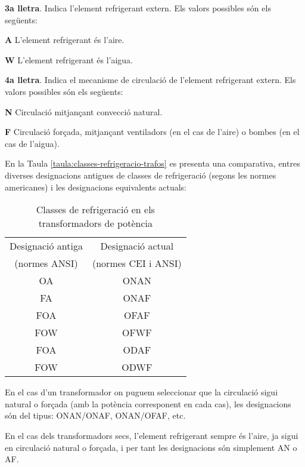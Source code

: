 \textbf{3a lletra}. Indica l'element refrigerant extern. Els valors
possibles s\'{o}n els seg\"{u}ents:
\begin{list}{}
   {\setlength{\labelwidth}{4.5mm} \setlength{\leftmargin}{4.5mm} \setlength{\labelsep}{2mm}}
   \item[\textbf{A}] L'element refrigerant \'{e}s l'aire.
   \item[\textbf{W}] L'element refrigerant \'{e}s l'aigua.
\end{list}
 

\textbf{4a lletra}. Indica el mecanisme de circulaci\'{o} de l'element
refrigerant extern. Els valors possibles s\'{o}n els seg\"{u}ents:
\begin{list}{}
   {\setlength{\labelwidth}{4.5mm} \setlength{\leftmargin}{4.5mm} \setlength{\labelsep}{2mm}}
   \item[\textbf{N}] Circulaci\'{o} mitjan\c{c}ant convecci\'{o} natural.
   \item[\textbf{F}] Circulaci\'{o} for\c{c}ada, mitjan\c{c}ant ventiladors (en el cas de
   l'aire) o bombes (en el cas de l'aigua).
\end{list}
 

En la Taula \vref{taula:classes-refrigeracio-trafos} es presenta una
comparativa, entres diverses designacions antigues de classes de
refrigeraci\'{o} (segons les normes americanes) i les designacions
equivalents actuals:
\begin{table}[htb]
   \caption{\label{taula:classes-refrigeracio-trafos}
   Classes de refrigeraci\'{o} en els transformadors de pot\`{e}ncia}
   \begin{center}\begin{tabular}{cc}
   \toprule[1pt]
   Designaci\'{o} antiga & Designaci\'{o} actual \\
   (normes \textsf{\textsf{ANSI}})     & (normes \textsf{\textsf{CEI}} i
   \textsf{\textsf{ANSI}}) \\
   \midrule
   OA & ONAN   \\
   FA & ONAF   \\
   FOA & OFAF  \\
   FOW & OFWF  \\
   FOA & ODAF  \\
   FOW & ODWF \\
   \bottomrule[1pt]
   \end{tabular} \end{center}
\end{table}

En el cas d'un transformador on puguem seleccionar que la circulaci\'{o}
sigui natural o for\c{c}ada (amb la pot\`{e}ncia corresponent en cada cas),
les designacions s\'{o}n del tipus: ONAN/ONAF, ONAN/OFAF, etc.

En el cas dels transformadors secs, l'element refrigerant sempre \'{e}s
l'aire, ja sigui en circulaci\'{o} natural o for\c{c}ada, i per tant les
designacions s\'{o}n simplement AN o AF.
